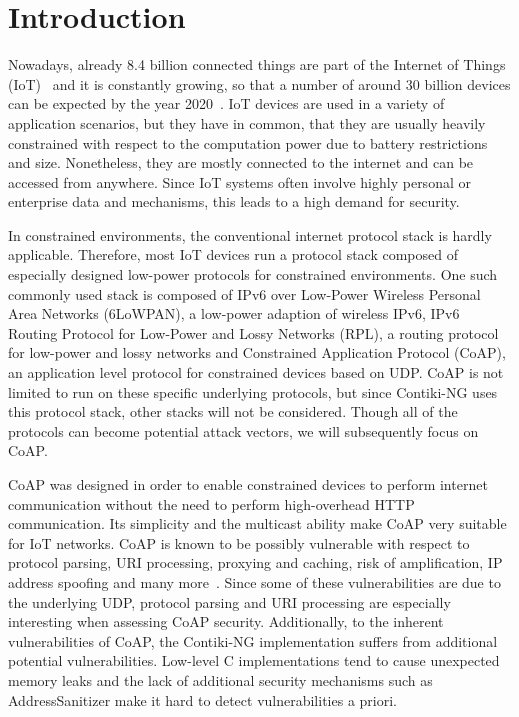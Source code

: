 \section{Introduction}
\label{section:introduction}


Nowadays, already 8.4 billion connected things are part of the Internet of Things (IoT)~\cite{IoTForecastGartner} and it is constantly growing, so that a number of around 30 billion devices can be expected by the year 2020~\cite{IoTForecastNordrum}. IoT devices are used in a variety of application scenarios, but they have in common, that they are usually heavily constrained with respect to the computation power due to battery restrictions and size. Nonetheless, they are mostly connected to the internet and can be accessed from anywhere. Since IoT systems often involve highly personal or enterprise data and mechanisms, this leads to a high demand for security.

In constrained environments, the conventional internet protocol stack is hardly applicable. Therefore, most IoT devices run a protocol stack composed of especially designed low-power protocols for constrained environments. One such commonly used stack is composed of IPv6 over Low-Power Wireless Personal Area Networks (6LoWPAN), a low-power adaption of wireless IPv6, IPv6 Routing Protocol for Low-Power and Lossy Networks (RPL), a routing protocol for low-power and lossy networks and Constrained Application Protocol (CoAP), an application level protocol for constrained devices based on UDP. CoAP is not limited to run on these specific underlying protocols, but since Contiki-NG uses this protocol stack, other stacks will not be considered. Though all of the protocols can become potential attack vectors, we will subsequently focus on CoAP.

CoAP was designed in order to enable constrained devices to perform internet communication without the need to perform high-overhead HTTP communication. Its simplicity and the multicast ability make CoAP very suitable for IoT networks.
CoAP is known to be possibly vulnerable with respect to protocol parsing, URI processing, proxying and caching, risk of amplification, IP address spoofing and many more~\cite{RFC7252}. Since some of these vulnerabilities are due to the underlying UDP, protocol parsing and URI processing are especially interesting when assessing CoAP security. Additionally, to the inherent vulnerabilities of CoAP, the Contiki-NG implementation suffers from additional potential vulnerabilities. Low-level C implementations tend to cause unexpected memory leaks and the lack of additional security mechanisms such as AddressSanitizer make it hard to detect vulnerabilities a priori.

